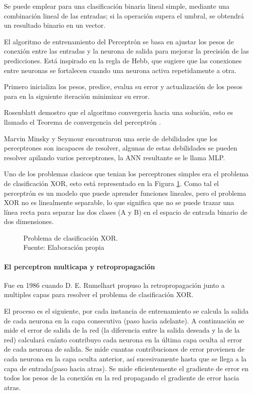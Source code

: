 Se puede emplear para una clasificación binaria lineal simple, mediante una combinación lineal de las entradas; si la operación supera el umbral, se obtendrá un resultado binario en un vector.

El algoritmo de entrenamiento del Perceptrón se basa en ajustar los pesos de conexión entre las entradas y la neurona de salida para mejorar la precisión de las predicciones. Está inspirado en la regla de Hebb, que sugiere que las conexiones entre neuronas se fortalecen cuando una neurona activa repetidamente a otra.

Primero inicializa los pesos, predice, evalua su error y actualización de los pesos para en la siguiente iteración minimizar su error.

Rosenblatt demostro que el algoritmo convergeria hacia una solución, esto es llamado el Teorema de convergencia del perceptrón \cite{geron2018neural}.

Marvin Minsky y Seymour encontraron una serie de debilidades que los perceptrones son incapaces de resolver, algunas de estas debilidades se pueden resolver apilando varios perceptrones, la \gls{ANN} resultante se le llama \gls{MLP}.

Uno de los problemas clasicos que tenian los perceptrones simples era el problema de clasificación XOR, esto está representado en la Figura \ref{fig:problem-xor}. Como tal el perceptrón es un modelo que puede aprender funciones lineales, pero el problema XOR no es linealmente separable, lo que significa que no se puede trazar una línea recta para separar las dos clases (A y B) en el espacio de entrada binario de dos dimensiones.

\begin{figure}[H]
    \centering
    \centerline{}
    \caption{Problema de clasificación XOR.\\Fuente: Elaboración propia}
    \label{fig:problem-xor}
\end{figure}


\paragraph*{El perceptron multicapa y retropropagación}

Fue en 1986 cuando {D. E. Rumelhart} propuso la retropropagación junto a multiples capas para resolver el problema de clasificación XOR.

El proceso es el siguiente, por cada instancia de entrenamiento se calcula la salida de cada neurona en la capa consecutiva (paso hacia adelante). A continuación se mide el error de salida de la red (la diferencia entre la salida deseada y la de la red) calculará cuánto contribuyo cada neurona en la última capa oculta al error de cada neurona de salida. Se mide cuantas contribuciones de error provienen de cada neurona en la capa oculta anterior, así sucesivamente hasta que se llega a la capa de entrada(paso hacia atras). Se mide eficientemente el gradiente de error en todos los pesos de la conexión en la red propagando el gradiente de error hacia atras. \cite{geron2018neural}

